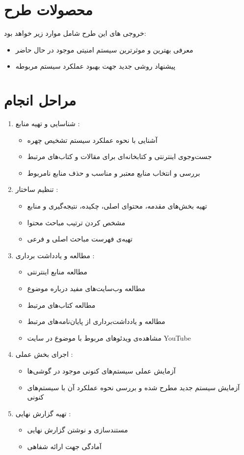 \documentclass[paper=a4, fontsize=11pt]{article}
\begin{document}
\section*{\LARGE محصولات طرح }

\par
خروجی های این طرح شامل موارد زیر خواهد بود:
\begin{itemize}
    \item	معرفی بهترین و موثرترین سیستم امنیتی موجود در حال حاضر
    \item 	پیشنهاد روشی جدید جهت بهبود عملکرد سیستم مربوطه
\end{itemize}

\section*{\LARGE مراحل انجام }
\begin{enumerate}
    \item شناسایی و تهیه منابع :
    \begin{itemize}
        \item آشنایی با نحوه عملکرد سیستم تشخیص چهره
        \item جست‌وجوی اینترنتی و کتابخانه‌ای برای مقالات و کتاب‌های مرتبط
        \item بررسی و انتخاب منابع معتبر و مناسب و حذف منابع نامربوط
    \end{itemize}
    \item تنظیم ساختار :
    \begin{itemize}
        \item تهیه بخش‌های مقدمه، محتوای اصلی، چکیده،‌ نتیجه‌گیری و منابع
        \item مشخص کردن ترتیب مباحث محتوا
        \item تهیه‌ی فهرست مباحث اصلی و فرعی
    \end{itemize}
    \newpage
    \item مطالعه و یادداشت برداری :
    \begin{itemize}
        \item مطالعه منابع اینترنتی
        \item مطالعه وب‌سایت‌های مفید درباره موضوع
        \item مطالعه کتاب‌های مرتبط
        \item مطالعه و یادداشت‌برداری از پایان‌نامه‌های مرتبط
        \item مشاهده‌ی ویدئوهای مربوط با موضوع در سایت YouTube
    \end{itemize}
    \item اجرای بخش عملی :
    \begin{itemize}
        \item آزمایش عملی سیستم‌های کنونی موجود در گوشی‌ها
        \item آزمایش سیستم جدید مطرح شده و بررسی نحوه عملکرد آن با سیستم‌های کنونی
    \end{itemize}
    \item تهیه گزارش نهایی :
    \begin{itemize}
        \item مستندسازی و نوشتن گزارش نهایی
        \item آمادگی جهت ارائه شفاهی
    \end{itemize}
\end{enumerate}
\newpage
\end{document}
